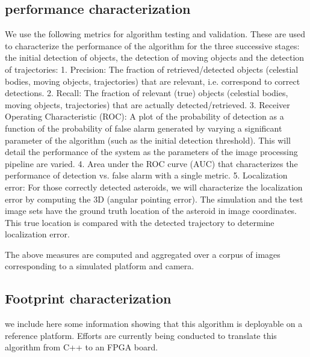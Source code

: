 \subsection{performance characterization}

We use the following metrics for algorithm testing and validation.  These are used to characterize the performance of the algorithm for the three successive stages: the initial detection of objects, the detection of moving objects and the detection of trajectories:
1.	Precision: The fraction of retrieved/detected objects (celestial bodies, moving objects, trajectories) that are relevant, i.e. correspond to correct detections.
2.	Recall: The fraction of relevant (true) objects (celestial bodies, moving objects, trajectories) that are actually detected/retrieved.
3.	Receiver Operating Characteristic (ROC): A plot of the probability of detection as a function of the probability of false alarm generated by varying a significant parameter of the algorithm (such as the initial detection threshold).  This will detail the performance of the system as the parameters of the image processing pipeline are varied. 
4.	Area under the ROC curve (AUC) that characterizes the performance of detection vs. false alarm with a single metric.
5.	Localization error: For those correctly detected asteroids, we will characterize the localization error by computing the 3D (angular pointing error).  The simulation and the test image sets have the ground truth location of the asteroid in image coordinates.  This true location is compared with the detected trajectory to determine localization error.

The above measures are computed and aggregated over a corpus of images corresponding to a simulated platform and camera.
\subsection{Footprint characterization}
we include here some information showing  that this algorithm is deployable on a reference platform.
Efforts are currently being conducted to translate this algorithm from C++ to an FPGA board. 
